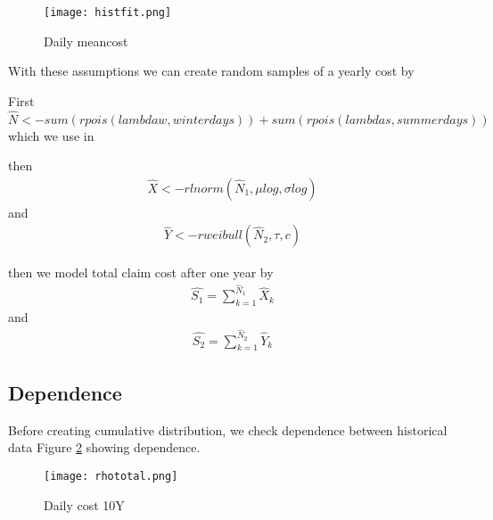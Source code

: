 \documentclass[11pt]{article}
\begin{document}
 \begin{figure}[H]
 \center
  \texttt{[image: histfit.png]}
  \caption{Daily meancost}
  \label{fig:samplefig3}
\end{figure}

With these assumptions we can 
 create random samples of a yearly cost by

First $\hat{N} <-  sum(rpois(lambdaw,winterdays)) +  sum(rpois(lambdas,summerdays))$
which we use in

then
\begin{align} \label{eq:sum1}
	\hat{X} <- rlnorm(\hat{N}_1,\mu log,\sigma log) 
\end{align}
and
\begin{align} \label{eq:sum2}
	 \hat{Y} <- rweibull(\hat{N}_2,\tau,c)
\end{align}


then we model total claim cost after one year by
\begin{align} \label{eq:sum1}
	\hat{S_1} = \sum_{k=1}^{\hat{N}_1} \hat{ X}_k   
\end{align}
and
\begin{align} \label{eq:sum2}
	 \hat{S_2} = \sum_{k=1}^{\hat{N}_2} \hat{Y}_k
\end{align}


\subsection*{Dependence}
Before creating cumulative distribution, we check dependence between historical data
 Figure \ref{fig:samplefig4} showing dependence.


 \begin{figure}[H]
 \center
  \texttt{[image: rhototal.png]}
  \caption{Daily cost 10Y}
  \label{fig:samplefig4}
\end{figure}


\end{document}
